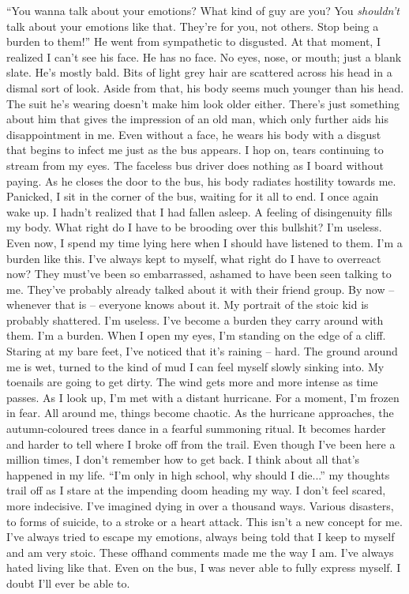 \documentclass[a4paper, 12pt]{book}
\newcommand\tab[1][1cm]{\hspace*{#1}}
\begin{document}
\newline
\tab
``You wanna talk about your emotions? What kind of guy are you? You \textit{shouldn’t} talk about your emotions like that. They’re for you, not others. Stop being a burden to them!'' He went from sympathetic to disgusted. At that moment, I realized I can’t see his face. He has no face. No eyes, nose, or mouth; just a blank slate. He’s mostly bald. Bits of light grey hair are scattered across his head in a dismal sort of look. Aside from that, his body seems much younger than his head. The suit he’s wearing doesn’t make him look older either. There’s just something about him that gives the impression of an old man, which only further aids his disappointment in me.
\newline
\tab
Even without a face, he wears his body with a disgust that begins to infect me just as the bus appears. I hop on, tears continuing to stream from my eyes. The faceless bus driver does nothing as I board without paying. As he closes the door to the bus, his body radiates hostility towards me. Panicked, I sit in the corner of the bus, waiting for it all to end.
\newline
\tab
I once again wake up. I hadn’t realized that I had fallen asleep. A feeling of disingenuity fills my body. What right do I have to be brooding over this bullshit? I’m useless. Even now, I spend my time lying here when I should have listened to them. I’m a burden like this. I’ve always kept to myself, what right do I have to overreact now? They must’ve been so embarrassed, ashamed to have been seen talking to me. They’ve probably already talked about it with their friend group. By now -- whenever that is -- everyone knows about it. My portrait of the stoic kid is probably shattered. I’m useless. I’ve become a burden they carry around with them. I’m a burden.
\newline
\tab
When I open my eyes, I’m standing on the edge of a cliff. Staring at my bare feet, I’ve noticed that it’s raining -- hard. The ground around me is wet, turned to the kind of mud I can feel myself slowly sinking into. My toenails are going to get dirty. The wind gets more and more intense as time passes. As I look up, I’m met with a distant hurricane. For a moment, I’m frozen in fear.
\newline
\tab
All around me, things become chaotic. As the hurricane approaches, the autumn-coloured trees dance in a fearful summoning ritual. It becomes harder and harder to tell where I broke off from the trail. Even though I’ve been here a million times, I don’t remember how to get back. I think about all that’s happened in my life. ``I’m only in high school, why should I die...'' my thoughts trail off as I stare at the impending doom heading my way. I don’t feel scared, more indecisive. I’ve imagined dying in over a thousand ways. Various disasters, to forms of suicide, to a stroke or a heart attack. This isn’t a new concept for me. I’ve always tried to escape my emotions, always being told that I keep to myself and am very stoic. These offhand comments made me the way I am. I’ve always hated living like that. Even on the bus, I was never able to fully express myself. I doubt I’ll ever be able to.
\end{document}
